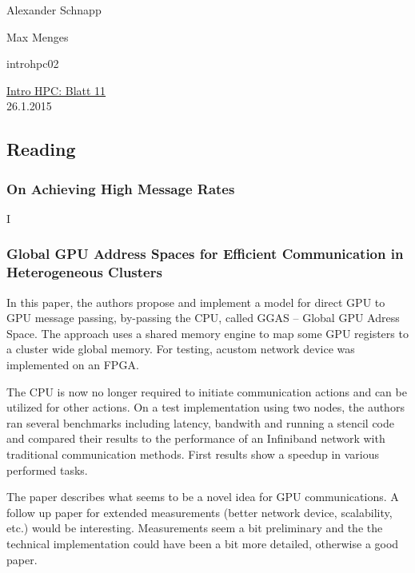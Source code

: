 \documentclass[a4paper,11pt]{scrartcl}
\begin{document}
\hfill Alexander Schnapp

\hfill Max Menges

\hfill introhpc02

\begin{center}
\underline{\Huge{Intro HPC: Blatt 11}}\\
\large{26.1.2015}\\
\end{center}


\subsection{Reading}
\subsubsection{On Achieving High Message Rates}
I
\subsubsection{Global GPU Address Spaces for Efficient
Communication in Heterogeneous Clusters}
In this paper, the authors propose and implement a model for direct GPU to GPU message passing, by-passing the CPU, called GGAS -- Global GPU Adress Space. The approach uses a shared memory engine to map some GPU registers to a cluster wide global memory. For testing, acustom network device was implemented on an FPGA. 

The CPU is now no longer required to initiate communication actions and can be utilized for other actions. On a test implementation using two nodes, the authors ran several benchmarks including latency, bandwith and running a stencil code and compared their results to the performance of an Infiniband network with traditional communication methods. First results show a speedup in various performed tasks.

The paper describes what seems to be a novel idea for GPU communications. A follow up paper for extended measurements (better network device, scalability, etc.) would be interesting. Measurements seem a bit preliminary and the the technical implementation could have been a bit more detailed, otherwise a good paper.
\end{document}
